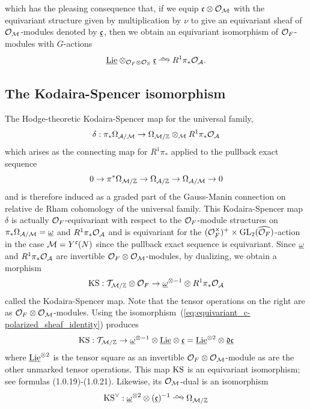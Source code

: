 \documentclass[main.tex]{subfiles}
\begin{document}
which has the pleasing consequence that, if we equip $\mathfrak{c} \otimes \mathcal{O}_{\mathcal{M}}$ with the equivariant structure given by multiplication by $\nu$ to give an equivariant sheaf of $\mathcal{O}_{\mathcal{M}}$-modules denoted by $\underline{\mathfrak{c}}$, then we obtain an equivariant isomorphism of $\mathcal{O}_F$-modules with $G$-actions
\begin{equation} \label{eq:equivariant_c-polarized_sheaf_identity}
\ul{\Lie} \ot_{\cO_F \ot \cO_S} \ul{\cc} \iso R^1 \pi_* \cO_{\cA}.
\end{equation}

\subsection{The Kodaira-Spencer isomorphism}

The Hodge-theoretic Kodaira-Spencer map for the universal family,
\[ \delta : \pi_* \Omega_{\mathcal{A}/\mathcal{M}} \to \Omega_{\mathcal{M} / \mathbb{Z}} \otimes_{\mathcal{M}} R^1 \pi_* \mathcal{O}_{\mathcal{A}} \]
which arises as the connecting map for $R^1 \pi_*$ applied to the pullback exact sequence
\[ 0 \to \pi^* \Omega_{\mathcal{M} / \mathbb{Z}} \to \Omega_{\mathcal{A} / \mathbb{Z}} \to \Omega_{\mathcal{A} / \mathcal{M}} \to 0 \]
and is therefore induced as a graded part of the Gauss-Manin connection on relative de Rham cohomology of the universal family.
This Kodaira-Spencer map $\delta$ is actually $\mathcal{O}_F$-equivariant with respect to the $\mathcal{O}_F$-module structures on $\pi_* \Omega_{\mathcal{A}/\mathcal{M}} = \underline{\omega}$ and $R^1 \pi_* \mathcal{O}_{\mathcal{A}}$ and is equivariant for the $(\mathcal{O}_F^\times)^+ \times \mathrm{GL}_2(\widehat{\mathcal{O}_F})$-action in the case $\mathcal{M} = Y^{\mathfrak{c}}(N)$ since the pullback exact sequence is equivariant. Since $\underline{\omega}$ and $R^1 \pi_* \mathcal{O}_{\mathcal{A}}$ are invertible $\mathcal{O}_F \otimes \mathcal{O}_{\mathcal{M}}$-modules, by dualizing, we obtain a morphism
\[ \mathrm{KS} : \mathcal{T}_{\mathcal{M} / \mathbb{Z}} \otimes \mathcal{O}_F \to \underline{\omega}^{\otimes -1} \otimes R^1 \pi_* \mathcal{O}_{\mathcal{A}} \]
called the Kodaira-Spencer map. Note that the tensor operations on the right are as $\mathcal{O}_F \otimes \mathcal{O}_{\mathcal{M}}$-modules. Using the isomorphism~(\ref{eq:equivariant_c-polarized_sheaf_identity}) produces
\begin{equation} \label{eq:kodaira-spencer_isomorphism}
\mathrm{KS} : \mathcal{T}_{\mathcal{M} / \mathbb{Z}} \to \underline{\omega}^{\otimes -1} \otimes \underline{\mathrm{Lie}} \otimes \underline{\mathfrak{c}} = \underline{\mathrm{Lie}}^{\otimes 2} \otimes \underline{\mathfrak{d} \mathfrak{c}}
\end{equation}
where $\underline{\mathrm{Lie}}^{\otimes 2}$ is the tensor square as an invertible $\mathcal{O}_F \otimes \mathcal{O}_{\mathcal{M}}$-module as are the other unmarked tensor operations. This map $\mathrm{KS}$ is an equivariant isomorphism; see \cite{katz:p-adic} formulas (1.0.19)-(1.0.21). Likewise, its $\mathcal{O}_{\mathcal{M}}$-dual is an isomorphism
\[ \KS^{\vee}  : \ul{\omega}^{\ot 2} \ot (\ul{\cc})^{-1} \iso \Omega_{\cM / \ZZ} \] 
\end{document}
